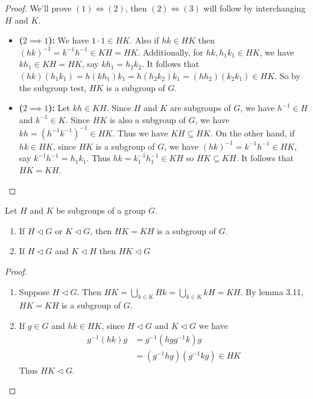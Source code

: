 \documentclass[11pt]{article}
\begin{document}
\begin{proof} We'll prove $(1)\iff (2)$, then $(2)\iff(3)$ will follow by interchanging $H$ and $K$.
\begin{itemize}
    \item\textbf{($2\implies1$):} We have $1\cdot1\in HK$. Also if $hk\in HK$ then $(hk)^{-1}=k^{-1}h^{-1}\in KH=HK$. Additionally, for $hk,h_1k_1\in HK$, we have $kh_1\in KH=HK$, say $kh_1=h_2k_2$. It follows that $(hk)(h_1k_1)=h(kh_1)k_1=h(h_2k_2)k_1=(hh_2)(k_2k_1)\in HK$. So by the subgroup test, $HK$ is a subgroup of $G$.
    \item\textbf{($2\implies1$):} Let $kh\in KH$. Since $H$ and $K$ are subgroups of $G$, we have $h^{-1}\in H$ and $k^{-1}\in K$. Since $HK$ is also a subgroup of $G$, we have $kh=(h^{-1}k^{-1})^{-1}\in HK$. Thus we have $KH\subseteq HK$. On the other hand, if $hk\in HK$, since $HK$ is a subgroup of $G$, we have $(hk)^{-1}=k^{-1}h^{-1}\in HK$, say $k^{-1}h^{-1}=h_1k_1$. Thus $hk=k_1^{-1}h_1^{-1}\in KH$ so $HK\subseteq KH$. It follows that $HK=KH$.
\end{itemize}
\end{proof}

\begin{proposition}
    Let $H$ and $K$ be subgroups of a group $G$.
    \begin{enumerate}
        \item If $H\lhd G$ or $K\lhd G$, then $HK=KH$ is a subgroup of $G$.
        \item If $H\lhd G$ and $K\lhd H$ then $HK\lhd G$
    \end{enumerate}
\end{proposition}

\begin{proof}\,
\begin{enumerate}
    \item Suppose $H\lhd G$. Then $HK=\bigcup\limits_{k\in K}Hk=\bigcup\limits_{k\in K}kH=KH$. By lemma 3.11, $HK=KH$ is a subgroup of $G$.

    \item If $g\in G$ and $hk\in HK$, since $H\lhd G$ and $K\lhd G$ we have
    \begin{align*}
        g^{-1}(hk)g&=g^{-1}(hgg^{-1}k)g \\
        &=(g^{-1}hg)(g^{-1}kg)\in HK
    \end{align*}
    Thus $HK\lhd G$.
\end{enumerate}
\end{proof}
\end{document}
